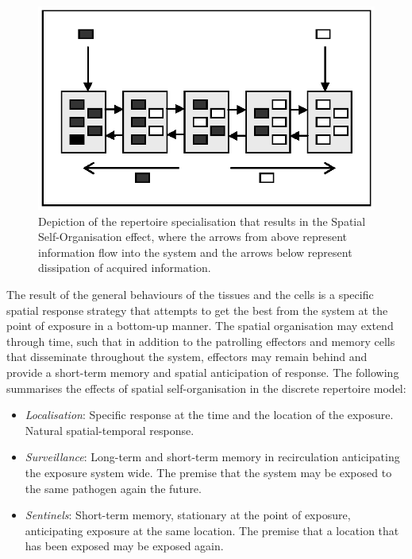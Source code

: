 \begin{figure}[ht]
	\centering
	\includegraphics[scale=0.75]{Tissues/tissues-effects-spatialorganisation}
	\caption{Depiction of the repertoire specialisation that results in the Spatial Self-Organisation effect, where the arrows from above represent information flow into the system and the arrows below represent dissipation of acquired information.}
	\label{fig:tissues:effects:selforganisation}
\end{figure}

The result of the general behaviours of the tissues and the cells is a specific spatial response strategy that attempts to get the best from the system at the point of exposure in a bottom-up manner. The spatial organisation may extend through time, such that in addition to the patrolling effectors and memory cells that disseminate throughout the system, effectors may remain behind and provide a short-term memory and spatial anticipation of response. The following summarises the effects of spatial self-organisation in the discrete repertoire model:

\begin{itemize}
	\item \emph{Localisation}: Specific response at the time and the location of the exposure. Natural spatial-temporal response.
	\item \emph{Surveillance}: Long-term and short-term memory in recirculation anticipating the exposure system wide. The premise that the system may be exposed to the same pathogen again the future.
	\item \emph{Sentinels}: Short-term memory, stationary at the point of exposure, anticipating exposure at the same location. The premise that a location that has been exposed may be exposed again.
\end{itemize}

